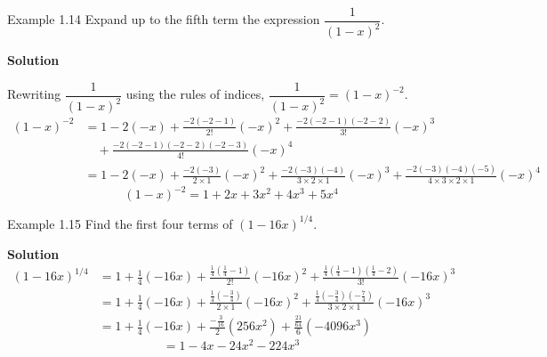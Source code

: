\begin{example}{Example 1.14}
Expand up to the fifth term the expression $\dfrac{1}{(1-x)^2}$.

\medskip\noindent\textbf{Solution}

Rewriting $\dfrac{1}{(1-x)^2}$ using the rules of indices, $\dfrac{1}{(1-x)^2} = (1-x)^{-2}$.
\begin{align*}
  (1-x)^{-2} &= 1 - 2(-x) + \frac{-2(-2-1)}{2!}(-x)^2 + \frac{-2(-2-1)(-2-2)}{3!}(-x)^3 \\
  &\quad + \frac{-2(-2-1)(-2-2)(-2-3)}{4!}(-x)^4 \\
  &= 1 - 2(-x) + \frac{-2(-3)}{2\times1}(-x)^2 + \frac{-2(-3)(-4)}{3\times2\times1}(-x)^3 + \frac{-2(-3)(-4)(-5)}{4\times3\times2\times1}(-x)^4
\end{align*}
\[
  (1-x)^{-2} = 1 + 2x + 3x^2 + 4x^3 + 5x^4
\]
\end{example}

\begin{example}{Example 1.15}
Find the first four terms of $(1-16x)^{1/4}$.

\medskip\noindent\textbf{Solution}
\begin{align*}
  (1-16x)^{1/4} &= 1 + \tfrac{1}{4}(-16x) + \frac{\tfrac{1}{4}\left(\tfrac{1}{4}-1\right)}{2!}(-16x)^2 + \frac{\tfrac{1}{4}\left(\tfrac{1}{4}-1\right)\left(\tfrac{1}{4}-2\right)}{3!}(-16x)^3 \\
  &= 1 + \tfrac{1}{4}(-16x) + \frac{\tfrac{1}{4}\left(-\tfrac{3}{4}\right)}{2\times1}(-16x)^2 + \frac{\tfrac{1}{4}\left(-\tfrac{3}{4}\right)\left(-\tfrac{7}{4}\right)}{3\times2\times1}(-16x)^3 \\
  &= 1 + \tfrac{1}{4}(-16x) + \frac{-\tfrac{3}{16}}{2}(256x^2) + \frac{\tfrac{21}{64}}{6}(-4096x^3)
\end{align*}
\[
  = 1 - 4x - 24x^2 - 224x^3
\]
\end{example}
